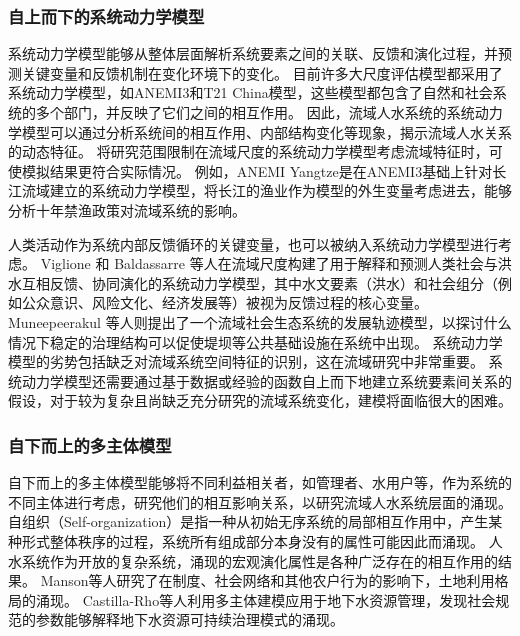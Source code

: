 \subsubsection{自上而下的系统动力学模型}

系统动力学模型能够从整体层面解析系统要素之间的关联、反馈和演化过程\cite{jaeger2017}，并预测关键变量和反馈机制在变化环境下的变化\cite{vaighan2017}。
目前许多大尺度评估模型都采用了系统动力学模型，如ANEMI3和T21 China模型，这些模型都包含了自然和社会系统的多个部门，并反映了它们之间的相互作用\cite{breach2021, qu2020}。
因此，流域人水系统的系统动力学模型可以通过分析系统间的相互作用、内部结构变化等现象，揭示流域人\textendash{}水关系的动态特征。
将研究范围限制在流域尺度的系统动力学模型考虑流域特征时，可使模拟结果更符合实际情况。
例如，ANEMI Yangtze是在ANEMI3基础上针对长江流域建立的系统动力学模型\cite{jiang2022}，将长江的渔业作为模型的外生变量考虑进去，能够分析十年禁渔政策对流域系统的影响\cite{jiang2022}。

人类活动作为系统内部反馈循环的关键变量，也可以被纳入系统动力学模型进行考虑。
Viglione 和 Baldassarre 等人在流域尺度构建了用于解释和预测人类社会与洪水互相反馈、协同演化的系统动力学模型\cite{viglione2014,dibaldassarre2015}，其中水文要素（洪水）和社会组分（例如公众意识、风险文化、经济发展等）被视为反馈过程的核心变量\cite{song2021a,ciullo2017}。
Muneepeerakul 等人则提出了一个流域社会\textendash{}生态系统的发展轨迹模型，以探讨什么情况下稳定的治理结构可以促使堤坝等公共基础设施在系统中出现\cite{muneepeerakul2017}。
系统动力学模型的劣势包括缺乏对流域系统空间特征的识别，这在流域研究中非常重要。
系统动力学模型还需要通过基于数据或经验的函数自上而下地建立系统要素间关系的假设，对于较为复杂且尚缺乏充分研究的流域系统变化，建模将面临很大的困难。

\subsubsection{自下而上的多主体模型}

自下而上的多主体模型能够将不同利益相关者，如管理者、水用户等，作为系统的不同主体进行考虑，研究他们的相互影响关系，以研究流域人水系统层面的涌现\cite{biggs2021}。
自组织（Self-organization）是指一种从初始无序系统的局部相互作用中，产生某种形式整体秩序的过程\cite{berkes2008}，系统所有组成部分本身没有的属性可能因此而涌现。
人水系统作为开放的复杂系统，涌现的宏观演化属性是各种广泛存在的相互作用的结果\cite{schluter2019}。
Manson等人研究了在制度、社会网络和其他农户行为的影响下，土地利用格局的涌现\cite{manson2016}。
Castilla-Rho等人利用多主体建模应用于地下水资源管理，发现社会规范的参数能够解释地下水资源可持续治理模式的涌现\cite{castilla-rho2017a,castilla-rho2015,castilla-rho2019,castilla-rho2017}。

